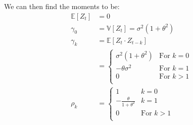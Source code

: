 We can then find the moments to be:
\begin{equation*}
    \begin{aligned}
       \mathbb{E}[Z_t] & = 0 \\
       \gamma_0 &= \mathbb{V}[Z_t] = \sigma^2(1 + \theta^2) \\
       \gamma_k &= \mathbb{E}[Z_t \cdot Z_{t-k}] \\
           &= 
           \begin{cases}
               \sigma^2(1 + \theta^2) & \text{For $k=0$} \\
                   -\theta\sigma^2 & \text{For $k=1$} \\
                   0  & \text{For $k>1$} \\
           \end{cases} \\
        \rho_k &= \begin{cases}
                1 & \text{$k = 0$}\\
                -\frac{\theta}{1 + \theta^2} & \text{$k = 1$}\\
                0  & \text{For $k>1$} \\
            \end{cases}
    \end{aligned}
\end{equation*}


